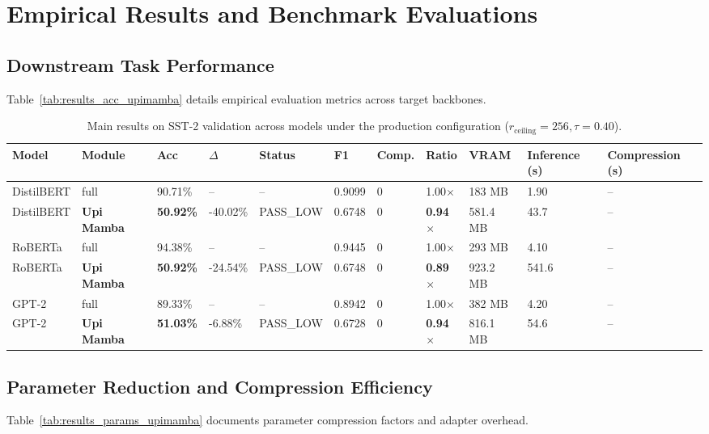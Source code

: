 \section{Empirical Results and Benchmark Evaluations}

\subsection{Downstream Task Performance}
Table~\ref{tab:results_acc_upimamba} details empirical evaluation metrics across target backbones.

\begin{table}[t]
\centering
\small
\begin{tabular}{lllllllllll}
\toprule
\textbf{Model} & \textbf{Module} & \textbf{Acc} & \textbf{$\Delta$} & \textbf{Status} & \textbf{F1} & \textbf{Comp.} & \textbf{Ratio} & \textbf{VRAM} & \textbf{Inference (s)} & \textbf{Compression (s)} \\
\midrule
DistilBERT & full & 90.71\% & -- & -- & 0.9099 & 0 & 1.00$\times$ & 183 MB & 1.90 & -- \\
DistilBERT & \textbf{Upi Mamba} & \textbf{50.92\%} & -40.02\% & PASS\_LOW & 0.6748 & 0 & \textbf{0.94$\times$} & 581.4 MB & 43.7 & -- \\
RoBERTa & full & 94.38\% & -- & -- & 0.9445 & 0 & 1.00$\times$ & 293 MB & 4.10 & -- \\
RoBERTa & \textbf{Upi Mamba} & \textbf{50.92\%} & -24.54\% & PASS\_LOW & 0.6748 & 0 & \textbf{0.89$\times$} & 923.2 MB & 541.6 & -- \\
GPT-2 & full & 89.33\% & -- & -- & 0.8942 & 0 & 1.00$\times$ & 382 MB & 4.20 & -- \\
GPT-2 & \textbf{Upi Mamba} & \textbf{51.03\%} & -6.88\% & PASS\_LOW & 0.6728 & 0 & \textbf{0.94$\times$} & 816.1 MB & 54.6 & -- \\
\bottomrule
\end{tabular}
\caption{Main results on SST-2 validation across models under the production configuration ($r_{\mathrm{ceiling}}=256, \tau=0.40$).}
\label{tab:main_sst2}
\end{table}

\subsection{Parameter Reduction and Compression Efficiency}
Table~\ref{tab:results_params_upimamba} documents parameter compression factors and adapter overhead.

